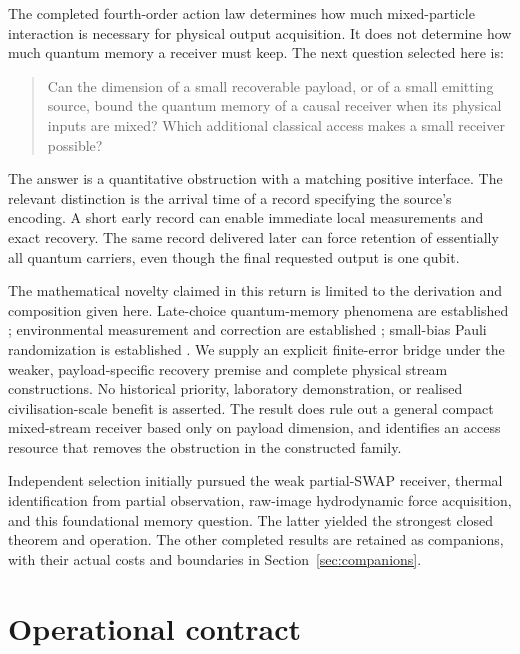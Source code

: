 \documentclass[11pt]{article}
\begin{document}
The completed fourth-order action law determines how much mixed-particle
interaction is necessary for physical output acquisition. It does not determine
how much quantum memory a receiver must keep. The next question selected here is:
\begin{quote}
Can the dimension of a small recoverable payload, or of a small emitting source,
bound the quantum memory of a causal receiver when its physical inputs are mixed?
Which additional classical access makes a small receiver possible?
\end{quote}
The answer is a quantitative obstruction with a matching positive interface.
The relevant distinction is the arrival time of a record specifying the source's
encoding. A short early record can enable immediate local measurements and exact
recovery. The same record delivered later can force retention of essentially all
quantum carriers, even though the final requested output is one qubit.

The mathematical novelty claimed in this return is limited to the derivation
and composition given here. Late-choice quantum-memory phenomena are established
\cite{bww,brw}; environmental measurement and correction are established
\cite{gw}; small-bias Pauli randomization is established \cite{aghp,as}.
We supply an explicit finite-error bridge under the weaker, payload-specific
recovery premise and complete physical stream constructions. No historical
priority, laboratory demonstration, or realised civilisation-scale benefit is
asserted. The result does rule out a general compact mixed-stream receiver based
only on payload dimension, and identifies an access resource that removes the
obstruction in the constructed family.

Independent selection initially pursued the weak partial-SWAP receiver, thermal
identification from partial observation, raw-image hydrodynamic force acquisition,
and this foundational memory question. The latter yielded the strongest closed
theorem and operation. The other completed results are retained as companions,
with their actual costs and boundaries in Section~\ref{sec:companions}.

\section{Operational contract}
\end{document}
